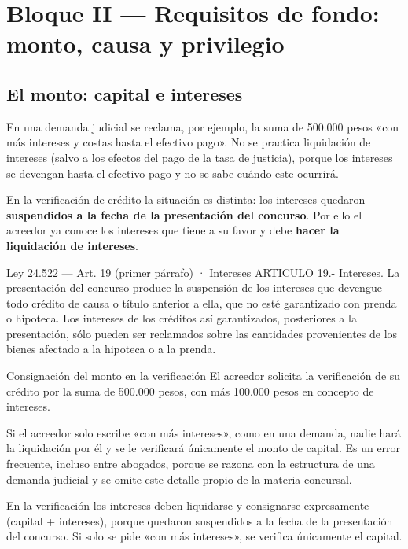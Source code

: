 \documentclass[12pt,oneside]{book}
\begin{document}
\chapter[Monto, causa y privilegio]{Bloque II — Requisitos de fondo: monto, causa y privilegio}

\section{El monto: capital e intereses}

En una demanda judicial se reclama, por ejemplo, la suma de 500.000 pesos «con más intereses y costas hasta el efectivo pago». No se practica liquidación de intereses (salvo a los efectos del pago de la tasa de justicia), porque los intereses se devengan hasta el efectivo pago y no se sabe cuándo este ocurrirá.

En la verificación de crédito la situación es distinta: los intereses quedaron \textbf{suspendidos a la fecha de la presentación del concurso}. Por ello el acreedor ya conoce los intereses que tiene a su favor y debe \textbf{hacer la liquidación de intereses}.

\begin{legal}{Ley 24.522 — Art. 19 (primer párrafo) · Intereses}
ARTICULO 19.- Intereses. La presentación del concurso produce la suspensión de los intereses que devengue todo crédito de causa o título anterior a ella, que no esté garantizado con prenda o hipoteca. Los intereses de los créditos así garantizados, posteriores a la presentación, sólo pueden ser reclamados sobre las cantidades provenientes de los bienes afectado a la hipoteca o a la prenda.
\end{legal}

\begin{example}{Consignación del monto en la verificación}
El acreedor solicita la verificación de su crédito por la suma de 500.000 pesos, con más 100.000 pesos en concepto de intereses.
\end{example}

Si el acreedor solo escribe «con más intereses», como en una demanda, nadie hará la liquidación por él y se le verificará únicamente el monto de capital. Es un error frecuente, incluso entre abogados, porque se razona con la estructura de una demanda judicial y se omite este detalle propio de la materia concursal.

\begin{important}
En la verificación los intereses deben liquidarse y consignarse expresamente (capital + intereses), porque quedaron suspendidos a la fecha de la presentación del concurso. Si solo se pide «con más intereses», se verifica únicamente el capital.
\end{important}
\end{document}
